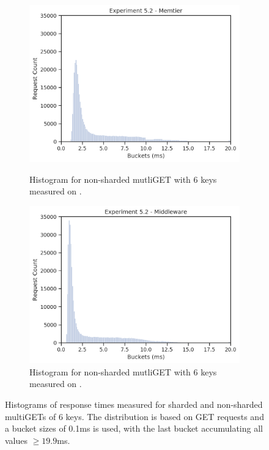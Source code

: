 \begin{figure}
            \begin{subfigure}[t!]{0.48\textwidth}
                \centering
                \includegraphics[width=\textwidth]{../data_analysis/figures/5-2_mt_histogram.png}
                \caption{Histogram for non-sharded mutliGET with 6 keys measured on
                \cli.\label{fig:histogram_nonsharded_mt}}
                \includegraphics[width=\textwidth]{../data_analysis/figures/5-2_mw_histogram.png}
                \caption{Histogram for non-sharded mutliGET with 6 keys measured on
                \mw.\label{fig:histogram_nonsharded_nw}}
            \end{subfigure}
            \caption{Histograms of response times measured for sharded and non-sharded multiGETs of 6 keys. The
                     distribution is based on GET requests and a bucket sizes of 0.1ms is used, with the last
                     bucket accumulating all values $\geq19.9$ms.\label{fig:histograms}}
        \end{figure}

